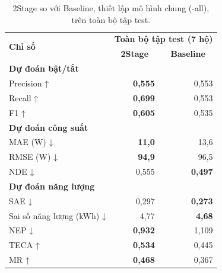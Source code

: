 \begin{table}[H]
\centering
\caption{2Stage so với Baseline, thiết lập mô hình chung (-all), trên toàn bộ tập test.}\label{nilm:tab3}
\footnotesize
\setlength{\tabcolsep}{3.5pt}\renewcommand{\arraystretch}{1.12}
\begin{adjustbox}{max width=\linewidth}
\begin{tabular}{|l|r|r|}
\hline
\multirow{2}{*}{\textbf{Chỉ số}} & \multicolumn{2}{c|}{\textbf{Toàn bộ tập test (7 hộ)}} \\ \cline{2-3}
 & \multicolumn{1}{c|}{\textbf{2Stage}} & \multicolumn{1}{c|}{\textbf{Baseline}} \\ \cline{1-1}
\multicolumn{3}{|l|}{\textbf{Dự đoán bật/tắt}} \\ \hline
Precision ↑ & \textbf{0,555} & 0,553 \\ \hline
Recall ↑ & \textbf{0,699} & 0,553 \\ \hline
F1 ↑ & \textbf{0,605} & 0,535 \\ \cline{1-1}
\multicolumn{3}{|l|}{\textbf{Dự đoán công suất}} \\ \hline
MAE (W) ↓ & \textbf{11,0} & 13,6 \\ \hline
RMSE (W) ↓ & \textbf{94,9} & 96,5 \\ \hline
NDE ↓ & 0,555 & \textbf{0,497} \\ \cline{1-1}
\multicolumn{3}{|l|}{\textbf{Dự đoán năng lượng}} \\ \hline
SAE ↓ & 0,297 & \textbf{0,273} \\ \hline
Sai số năng lượng (kWh) ↓ & 4,77 & \textbf{4,68} \\ \hline
NEP ↓ & \textbf{0,932} & 1,109 \\ \hline
TECA ↑ & \textbf{0,534} & 0,445 \\ \hline
MR ↑ & \textbf{0,468} & 0,367 \\ \hline
\end{tabular}
\end{adjustbox}
\end{table}


